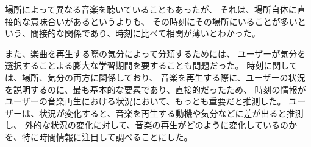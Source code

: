 \documentclass[11pt, onecolumn]{jsarticle}
\begin{document}
場所によって異なる音楽を聴いていることもあったが、
それは、場所自体に直接的な意味合いがあるというよりも、
その時刻にその場所にいることが多いという、間接的な関係であり、時刻に比べて相関が薄いとわかった。

また、楽曲を再生する際の気分によって分類するためには、
ユーザーが気分を選択することよる膨大な学習期間を要することも問題だった。
時刻に関しては、場所、気分の両方に関係しており、
音楽を再生する際に、ユーザーの状況を説明するのに、最も基本的な要素であり、直接的だったため、
時刻の情報がユーザーの音楽再生における状況において、もっとも重要だと推測した。
ユーザーは、状況が変化すると、音楽を再生する動機や気分などに差が出ると推測し、
外的な状況の変化に対して、音楽の再生がどのように変化しているのかを、特に時間情報に注目して調べることにした。


%

\end{document}

